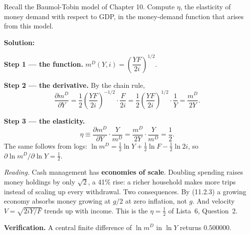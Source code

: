 \documentclass[12pt, letterpaper]{article}
\newcommand{\pd}[2]{\dfrac{\partial #1}{\partial #2}}
\newcommand{\mD}{m^{D}}
\begin{document}
\begin{tcolorbox}[oddbox,title={Problem 11.1 \quad The Elasticity of Money Demand}]
\begin{tcolorbox}[questionbox]
Recall the Baumol-Tobin model of Chapter 10. Compute $\eta$, the elasticity of money demand with
respect to GDP, in the money-demand function that arises from this model.
\end{tcolorbox}

\textbf{Solution:}

\textbf{Step 1 --- the function.} $\mD(Y,i)=\left(\dfrac{YF}{2i}\right)^{1/2}$.

\textbf{Step 2 --- the derivative.} By the chain rule,
\[
\pd{\mD}{Y}=\frac12\left(\frac{YF}{2i}\right)^{-1/2}\cdot\frac{F}{2i}
=\frac12\left(\frac{YF}{2i}\right)^{1/2}\cdot\frac{1}{Y}
=\frac{\mD}{2Y}.
\]

\textbf{Step 3 --- the elasticity.}
\[
\eta\equiv\pd{\mD}{Y}\cdot\frac{Y}{\mD}=\frac{\mD}{2Y}\cdot\frac{Y}{\mD}=\boxed{\frac12}.
\]
The same follows from logs: $\ln\mD=\tfrac12\ln Y+\tfrac12\ln F-\tfrac12\ln 2i$, so
$\partial\ln\mD/\partial\ln Y=\tfrac12$.

\emph{Reading.} Cash management has \textbf{economies of scale}. Doubling spending raises
money holdings by only $\sqrt2$, a 41\% rise: a richer household makes more trips instead of
scaling up every withdrawal. Two consequences. By (11.2.3) a growing economy absorbs money
growing at $g/2$ at zero inflation, not $g$. And velocity $V=\sqrt{2iY/F}$ trends up with
income. This is the $\eta=\tfrac12$ of Lista~6, Question~2.

\textbf{Verification.} A central finite difference of $\ln\mD$ in $\ln Y$ returns $0.500000$. \checkmark
\end{tcolorbox}
\end{document}
